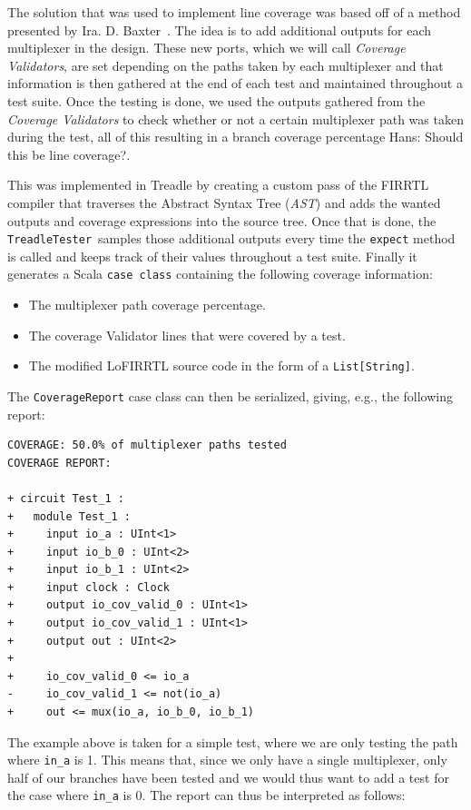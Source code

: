 \documentclass[runningheads]{llncs}
\newcommand{\hjd}[1]{{\color{pink} Hans: #1}}
\begin{document}
The solution that was used to implement line coverage was based off of a method presented by Ira. D. Baxter~\cite{branch-cov-made-easy:2002}. The idea is to add additional outputs for each multiplexer in the design. These new ports, which we will call \textit{Coverage Validators}, are set depending on the paths taken by each multiplexer and that information is then gathered at the end of each test and maintained throughout a test suite. Once the testing is done, we used the outputs gathered from the \textit{Coverage Validators} to check whether or not a certain multiplexer path was taken during the test, all of this resulting in a branch coverage percentage \hjd{Should this be line coverage?}.

This was implemented in Treadle by creating a custom pass of the FIRRTL compiler that traverses the Abstract Syntax Tree (\textit{AST}) and adds the wanted outputs and coverage expressions into the source tree. Once that is done, the \texttt{TreadleTester} samples those additional outputs every time the \texttt{expect} method is called and keeps track of their values throughout a test suite. Finally it generates a Scala \texttt{case class} containing the following coverage information:

\begin{itemize}
  \item The multiplexer path coverage percentage.
  \item The coverage Validator lines that were covered by a test.
  \item The modified LoFIRRTL source code in the form of a \texttt{List[String]}.
\end{itemize}

The \texttt{CoverageReport} case class can then be serialized, giving, e.g., the following report:
\begin{verbatim}
COVERAGE: 50.0% of multiplexer paths tested
COVERAGE REPORT:

+ circuit Test_1 :
+   module Test_1 :
+     input io_a : UInt<1>
+     input io_b_0 : UInt<2>
+     input io_b_1 : UInt<2>
+     input clock : Clock
+     output io_cov_valid_0 : UInt<1>
+     output io_cov_valid_1 : UInt<1>
+     output out : UInt<2>
+   
+     io_cov_valid_0 <= io_a
-     io_cov_valid_1 <= not(io_a)
+     out <= mux(io_a, io_b_0, io_b_1)
\end{verbatim}
The example above is taken for a simple test, where we are only testing the path where \texttt{in\_a} is 1. This means that, since we only have a single multiplexer, only half of our branches have been tested and we would thus want to add a test for the case where \texttt{in\_a} is 0. The report can thus be interpreted as follows:
\end{document}
